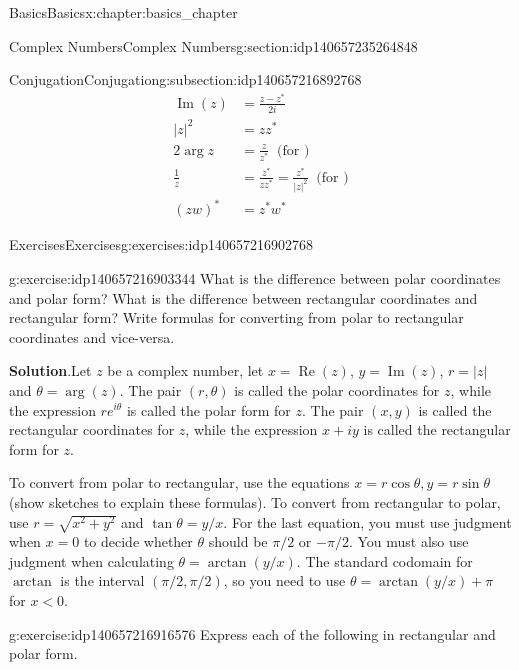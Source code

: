 \documentclass[oneside,10pt,]{book}
\numberwithin{equation}{section}
\DeclareMathOperator{\re}{Re}
\DeclareMathOperator{\im}{Im}
\newcommand{\lt}{<}
\newcommand{\amp}{&}
\begin{document}
\begin{chapterptx}{Basics}{}{Basics}{}{}{x:chapter:basics_chapter}
\begin{sectionptx}{Complex Numbers}{}{Complex Numbers}{}{}{g:section:idp140657235264848}
\begin{subsectionptx}{Conjugation}{}{Conjugation}{}{}{g:subsection:idp140657216892768}
\begin{align}
\im(z) \amp = \frac{z - z^\ast}{2i}\label{x:mrow:imagpartformula}\\
|z|^2 \amp = zz^\ast\label{x:mrow:zzbarisnormsq}\\
2\arg z \amp = \frac{z}{z^\ast} \;\;\text{(for )}\label{g:mrow:idp140657216900096}\\
\frac{1}{z}
\amp = \frac{z^\ast}{zz^\ast}= \frac{z^\ast}{|z|^2} \;\;\text{(for )}\label{g:mrow:idp140657216900976}\\
(zw)^\ast \amp = z^\ast w^\ast\label{g:mrow:idp140657216901888}
\end{align}
%
\end{subsectionptx}
%
%
\typeout{************************************************}
\typeout{************************************************}
%
\begin{exercises-subsection}{Exercises}{}{Exercises}{}{}{g:exercises:idp140657216902768}
\begin{divisionexercise}{1}{}{}{g:exercise:idp140657216903344}%
What is the difference between polar coordinates and polar form? What is the difference between rectangular coordinates and rectangular form?  Write formulas for converting from polar to rectangular coordinates and vice-versa.\par\smallskip%
\noindent\textbf{Solution}.\hypertarget{g:solution:idp140657216904256}{}\quad{}Let \(z\) be a complex number, let \(x=\re(z)\), \(y=\im(z)\), \(r=|z|\) and \(\theta = \arg(z)\).  The pair \((r,\theta)\) is called the polar coordinates for \(z\), while the expression \(re^{i\theta}\) is called the polar form for \(z\).  The pair \((x,y)\) is called the rectangular coordinates for \(z\), while the expression \(x+iy\) is called the rectangular form for \(z\).%
\par
To convert from polar to rectangular, use the equations \(x=r\cos \theta,
y=r\sin \theta\) (show sketches to explain these formulas).  To convert from rectangular to polar, use \(r=\sqrt{x^2+y^2}\) and \(\tan \theta =
y/x\).  For the last equation, you must use judgment when \(x=0\) to decide whether \(\theta\) should be \(\pi/2\) or \(-\pi/2\).  You must also use judgment when calculating \(\theta = \arctan (y/x)\). The standard codomain for \(\arctan\) is the interval \((\pi/2,\pi/2)\), so you need to use \(\theta = \arctan (y/x) + \pi\) for \(x\lt 0\).%
\end{divisionexercise}%
\begin{divisionexercise}{2}{}{}{g:exercise:idp140657216916576}%
Express each of the following in rectangular and polar form. %

\end{divisionexercise}
\end{exercises-subsection}
\end{sectionptx}
\end{chapterptx}
\end{document}
